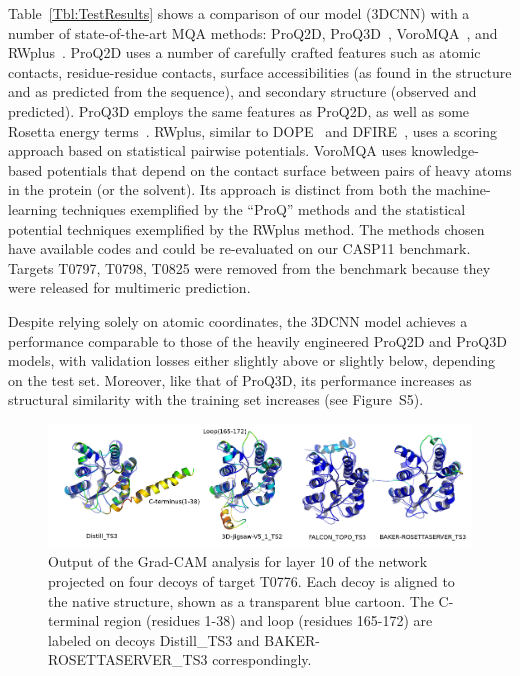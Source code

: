 \documentclass{bioinfo}
\begin{document}
Table~\ref{Tbl:TestResults} shows a comparison of our model (3DCNN)
with a number of state-of-the-art MQA methods: ProQ2D,
ProQ3D~\citep{uziela2017proq3d},
VoroMQA~\citep{olechnovivc2017voromqa}, and
RWplus~\citep{zhang2010novel}.
%
ProQ2D uses a number of carefully crafted features such as atomic
contacts, residue-residue contacts, surface accessibilities (as found
in the structure and as predicted from the sequence), and secondary
structure (observed and predicted). ProQ3D employs the same features
as ProQ2D, as well as some Rosetta energy
terms~\citep{leaverfay2011rosetta}.
%
RWplus, similar to DOPE~\citep{shen2006statistical} and
DFIRE~\citep{zhou2002distance}, uses a scoring approach based on
statistical pairwise potentials.
%
VoroMQA uses knowledge-based potentials that depend on the contact
surface between pairs of heavy atoms in the protein (or the
solvent). Its approach is distinct from both the machine-learning
techniques exemplified by the ``ProQ'' methods and the statistical
potential techniques exemplified by the RWplus method.
%
The methods chosen have available codes and could be re-evaluated on
our CASP11 benchmark. Targets T0797, T0798, T0825 were removed from
the benchmark because they were released for multimeric prediction.

Despite relying solely on atomic coordinates, the 3DCNN model achieves
a performance comparable to those of the heavily engineered ProQ2D and
ProQ3D models, with validation losses either slightly above or
slightly below, depending on the test set. Moreover, like that of
ProQ3D, its performance increases as structural similarity with the
training set increases (see Figure~S5).


\begin{figure}[!t]
    \centerline{\includegraphics[width=0.8\linewidth]{image7.png}}
    \vspace{-10pt}
    \caption{Output of the Grad-CAM analysis for layer 10 of the
      network projected on four decoys of target T0776. Each decoy is
      aligned to the native structure, shown as a transparent blue
      cartoon. The C-terminal region (residues 1-38) and loop (residues 165-172) 
      are labeled on decoys Distill\_TS3 and BAKER-ROSETTASERVER\_TS3 correspondingly.}
    \label{Fig:GradCAMT0776_more}
\end{figure}
\end{document}
